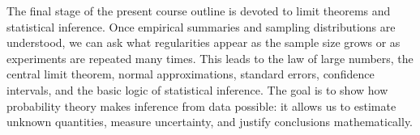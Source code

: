 The final stage of the present course outline is devoted to limit theorems and statistical inference. Once empirical summaries and sampling distributions are understood, we can ask what regularities appear as the sample size grows or as experiments are repeated many times. This leads to the law of large numbers, the central limit theorem, normal approximations, standard errors, confidence intervals, and the basic logic of statistical inference. The goal is to show how probability theory makes inference from data possible: it allows us to estimate unknown quantities, measure uncertainty, and justify conclusions mathematically.
